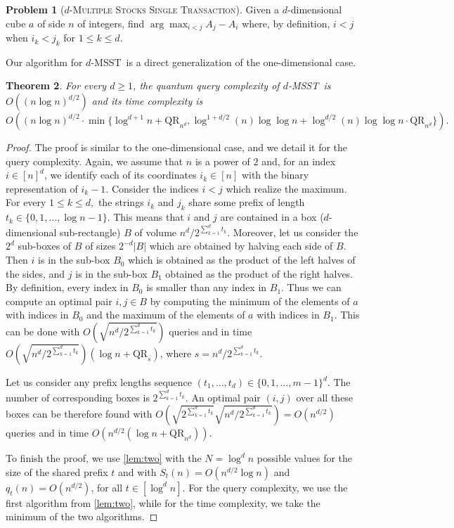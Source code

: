 \documentclass[12pt]{article}
\newcommand{\qr}{\mathrm{QR}}
\newcommand{\MSSTf}{\textsc{Multiple Stocks Single Transaction}}
\newcommand{\MSST}{\textsc{MSST}}
\newtheorem{theorem}{Theorem}
\theoremstyle{definition}
\newtheorem{problem}[theorem]{Problem}
\begin{document}
\begin{problem}[$d$-\MSSTf]
Given a $d$-dimensional cube $a$ of side $n$ of integers,  find $\arg\max_{i < j} A_j - A_i$ where, by definition, $i<j$ when $i_k < j_k$ for $1 \leq k \leq d.$
\end{problem}

Our algorithm for $d$-\MSST \ is a direct generalization of the one-dimensional case.
\begin{theorem}
\label{thm:ssmt}
For every $d \geq 1$, the quantum query complexity of $d$-\MSST \ is $O( (n \log n)^{d/2})$ and its time complexity is
$$
O \left ((n \log n)^{d/2} \cdot \min \{\log^{d+1} n + \qr_{n^d} , \log^{1 + d/2} (n) \log \log n + \log^{d/2} (n) \log \log n \cdot \qr_{n^d} \} \right).
$$
\end{theorem}
\begin{proof}
The proof is similar to the one-dimensional case, and we detail it for the query complexity.
Again, we assume that $n$ is a power of $2$ and, for an index $i \in [n]^d$, we identify each of its coordinates $i_k \in [n]$ with the binary representation of $i_k -1$.
Consider the indices $i < j$ which realize the maximum. For every $1 \leq k \leq d,$ the strings $i_k$ and $j_k$ share some 
prefix of length $t_k \in \{0,1,\ldots, \log n-1\}$.   
This means that $i$ and $j$ are  contained in a box ($d$-dimensional sub-rectangle) $B$ of volume $n^d / 2^{\sum_{k=1}^d t_k}.$
Moreover, let us consider the $2^d$ sub-boxes of $B$ of sizes $2^{-d} |B|$ which are obtained by halving each side of $B$.
Then $i$ is in the sub-box $B_0$ which is obtained as the product of the left halves of the sides, and $j$ is in the sub-box $B_1$ obtained as the product of the right halves. By definition, every index in $B_0$ is smaller than any index in $B_1$.
Thus we can compute an optimal pair $i,j \in B$ by computing the minimum of the elements of $a$ with indices in $B_0$ and the maximum of the elements of $a$ with indices in $B_1$. This can be done  with $O( \sqrt{ n^d / 2^{\sum_{k=1}^d t_k} } )$ queries
and in time $O( \sqrt{ n^d / 2^{\sum_{k=1}^d t_k} } ) (\log n + \qr_s)$, where $s =  n^d / 2^{\sum_{k=1}^d t_k} $.

Let us consider any prefix lengths sequence $(t_1, \ldots , t_d) \in \{0,1,\ldots, m-1\}^d$. The number of corresponding boxes is $ 2^{\sum_{k=1}^d t_k}$. An optimal pair $(i,j)$ over all these boxes can be therefore found with $O( \sqrt{2^{\sum_{k=1}^d t_k}}   \sqrt{ n^d / 2^{\sum_{k=1}^d t_k} }) = O(n^{d/2})$ queries and in time $O(n^{d/2} (\log n + \qr_{n^d}))$.

To finish the proof, we use \cref{lem:two} with the $N = \log^d n$ possible values for the size of the shared prefix $t$ and with $S_t(n) = O({n}^{d/2}  \log n )$ and $q_t(n) = O({n}^{d/2})$, for all $t \in [\log^d n]$. For the query complexity, we use the first algorithm from \cref{lem:two}, while for the time complexity, we take the minimum of the two algorithms.
\end{proof}
\end{document}
